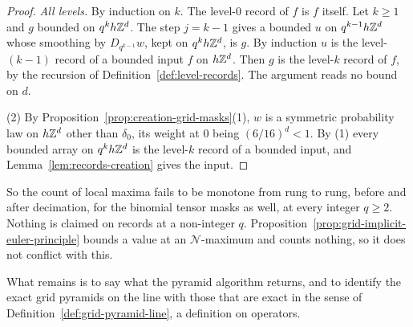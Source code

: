 \begin{proof}
\emph{All levels.} By induction on $k$. The level-$0$ record of $f$ is $f$ itself. Let $k \ge 1$
and $g$ bounded on $q^kh\mathbb{Z}^d$. The step $j = k-1$ gives a bounded $u$ on $q^{k-1}h\mathbb{Z}^d$ whose
smoothing by $D_{q^{k-1}}w$, kept on $q^kh\mathbb{Z}^d$, is $g$. By induction $u$ is the level-$(k-1)$
record of a bounded input $f$ on $h\mathbb{Z}^d$. Then $g$ is the level-$k$ record of $f$, by the
recursion of Definition~\ref{def:level-records}. The argument reads no bound on $d$.

(2) By Proposition~\ref{prop:creation-grid-masks}(1), $w$ is a symmetric probability law on
$h\mathbb{Z}^d$ other than $\delta_0$, its weight at $0$ being $(6/16)^d < 1$. By (1) every bounded array
on $q^kh\mathbb{Z}^d$ is the level-$k$ record of a bounded input, and Lemma~\ref{lem:records-creation}
gives the input.
\end{proof}

So the count of local maxima fails to be monotone from rung to rung, before and after decimation,
for the binomial tensor masks as well, at every integer $q \ge 2$. Nothing is claimed on records at
a non-integer $q$. Proposition~\ref{prop:grid-implicit-euler-principle} bounds a value at an
$\mathcal{N}$-maximum and counts nothing, so it does not conflict with this.

What remains is to say what the pyramid algorithm returns, and to identify the exact grid pyramids
on the line with those that are exact in the sense of Definition~\ref{def:grid-pyramid-line}, a
definition on operators.

